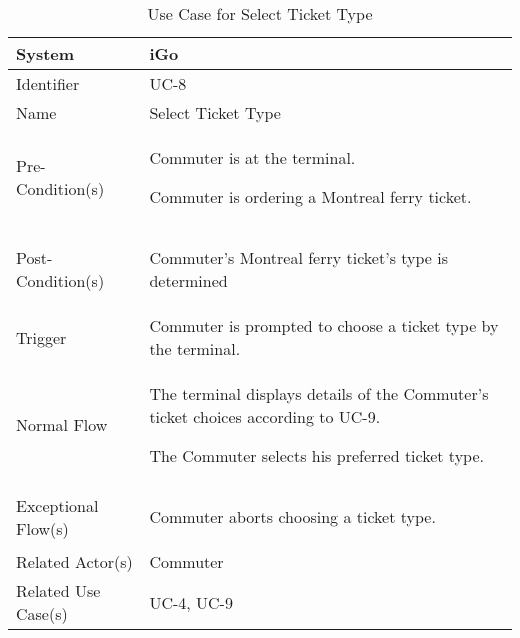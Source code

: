 \begin{table}[ht]
    \centering
    \begin{tabular}{|l|p{11cm}|}
        \hline
        System             & iGo\\
        \hline
        Identifier         & UC-8 \\
        \hline
        Name               & Select Ticket Type \\
        \hline
        Pre-Condition(s)   & 
        \begin{enumerate*}[itemjoin=\newline]
            \item Commuter is at the terminal.
            \item Commuter is ordering a Montreal ferry ticket.
        \end{enumerate*} \\
        \hline
        Post-Condition(s)  & 
        \begin{enumerate*}[itemjoin=\newline]
            \item Commuter's Montreal ferry ticket's type is determined
        \end{enumerate*} \\
        \hline
        Trigger            & Commuter is prompted to choose a ticket type by the terminal. \\
        \hline
        Normal Flow        & 
        \begin{enumerate*}[itemjoin=\newline]
            \item The terminal displays details of the Commuter's ticket choices according to UC-9.
            \item The Commuter selects his preferred ticket type.
        \end{enumerate*} \\
        \hline
        Exceptional Flow(s)& 
        \begin{enumerate*}[itemjoin=\newline]
            \item Commuter aborts choosing a ticket type.
        \end{enumerate*} \\
        \hline
        Related Actor(s)   & Commuter \\
        \hline
        Related Use Case(s)& UC-4, UC-9\\
        \hline
    \end{tabular}
    \caption{Use Case for Select Ticket Type}
    \label{tab:UC_SelectTicketType}
\end{table}

